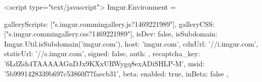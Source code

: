         <script type="text/javascript">
            Imgur.Environment = {
                galleryScripts:             ["\/\/s.imgur.com\/min\/gallery.js?1469221989"],
                galleryCSS:                 ["\/\/s.imgur.com\/min\/gallery.css?1469221989"],
                isDev:                      false,
                isSubdomain:                Imgur.Util.isSubdomain('imgur.com'),
                host:                       'imgur.com',
                cdnUrl:                     '//i.imgur.com',
                staticUrl:                  '//s.imgur.com',
                signed:                     false,
                auth:                       {},
                recaptcha_key:              '6LdZsh4TAAAAAGnDJx9KXxURWygq8exADiSHLP-M',
                msid:                       '5b9991428339b697c53860f77faecb31',
                beta:                       {
                    enabled: true,
                    inBeta:  false
                },
                
}
